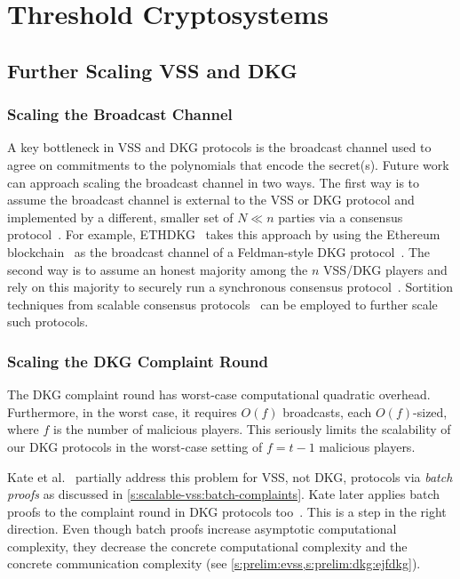 
\section{Threshold Cryptosystems}
\label{s:future-work:threshcrypto}

\subsection{Further Scaling VSS and DKG}

\subsubsection{Scaling the Broadcast Channel}
\label{s:future-work:threshcrypto:scaling-vss-broadcast}
A key bottleneck in VSS and DKG protocols is the broadcast channel used to agree on commitments to the polynomials that encode the secret(s).
Future work can approach scaling the broadcast channel in two ways.
The first way is to assume the broadcast channel is external to the VSS or DKG protocol and implemented by a different, smaller set of $N \ll n$ parties via a consensus protocol~\cite{pbft}.
For example, ETHDKG~\cite{SJSW19} takes this approach by using the Ethereum blockchain~\cite{ethereum} as the broadcast channel of a Feldman-style DKG protocol~\cite{GJKR07}.
The second way is to assume an honest majority among the $n$ VSS/DKG players and rely on this majority to securely run a synchronous consensus protocol~\cite{ADD+19}.
Sortition techniques from scalable consensus protocols~\cite{algorand} can be employed to further scale such protocols.

\subsubsection{Scaling the DKG Complaint Round}
\label{s:future-work:threshcrypto:scaling-dkg-complaints}
The DKG complaint round has worst-case computational quadratic overhead.
Furthermore, in the worst case, it requires $O(f)$ broadcasts, each $O(f)$-sized, where $f$ is the number of malicious players.
This seriously limits the scalability of our DKG protocols in the worst-case setting of $f=t-1$ malicious players.

Kate et al.~\cite{KZG10a} partially address this problem for VSS, not DKG, protocols via \textit{batch proofs} as discussed in \cref{s:scalable-vss:batch-complaints}.
Kate later applies batch proofs to the complaint round in DKG protocols too~\cite{Kate2010}.
This is a step in the right direction.
Even though batch proofs increase asymptotic computational complexity, they decrease the concrete computational complexity and the concrete communication complexity (see \cref{s:prelim:evss,s:prelim:dkg:ejfdkg}).

